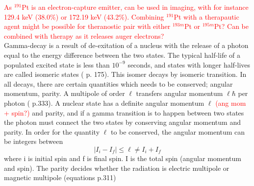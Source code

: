 
\noindent 
\textcolor{red}{As $^{191}$Pt is an electron-capture emitter, can be used in imaging, with for instance 129.4 keV (38.0\%) or 172.19 keV (43.2\%). Combining $^{191}$Pt with a therapautic agent might be possible for theranostic pair with either $^{193m}$Pt or $^{195m}$Pt? Can be combined with therapy as it releases auger electrons? }\\

Gamma-decay is a result of de-exitation of a nucleus with the release of a photon equal to the energy difference between the two states. The typical half-life of a populated excited state is less than $10^{-9}$ seconds, and states with longer half-lives are called isomeric states (\cite{KraneKennethS.Halliday1987} p. 175). This isomer decays by isomeric transition. In all decays, there are certain quantities which needs to be conserved; angular momentum, parity. A multipole of order $\ell$ transfers angular momentum $\ell \hbar$ per photon (\cite{KraneKennethS.Halliday1987} p.333). A nuclear state has a definite angular momentum $\ell$ \textcolor{red}{(ang mom + spin?)} and parity, and if a gamma transition is to happen between two states the photon must connect the two states by conserving angular momentum and parity. In order for the quantity $\ell$ to be conserved, the angular momentum can be integers between 
\begin{equation}
    |I_i - I_f| \leq \ell \neq I_i + I_f
\end{equation}
where i is initial spin and f is final spin. I is the total spin (angular momentum and spin). The parity decides whether  the radiation is electric multipole or magnetic multipole (equations \cite{KraneKennethS.Halliday1987} p.311)

